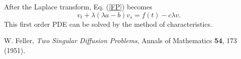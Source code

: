 \documentclass[12pt]{article}
\begin{document}
  After the Laplace transform, Eq. (\ref{FP}) becomes
  \begin{equation}
    v_t + \lambda(\lambda a - b) v_s = f(t) - c\lambda v.
  \end{equation}
  This first order PDE can be solved by the method of characteristics.


\begin{thebibliography}{99}
    W. Feller, {\it Two Singular Diffusion Problems}, Annals of Mathematics {\bf 54}, 173 (1951).

\end{thebibliography}
\end{document}
